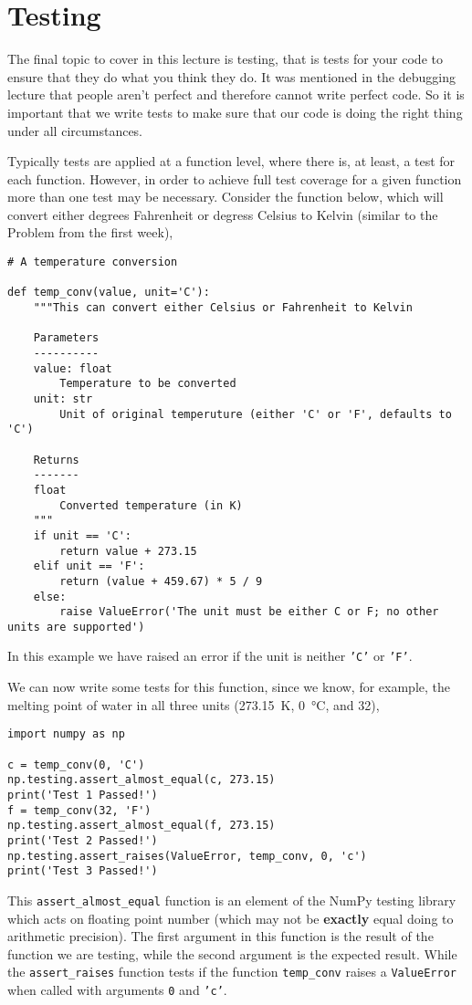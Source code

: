 \documentclass[a4paper]{article}
\begin{document}
\section{Testing}
The final topic to cover in this lecture is testing, that is tests for your code to ensure that they do what you think they do.
It was mentioned in the debugging lecture that people aren't perfect and therefore cannot write perfect code.
So it is important that we write tests to make sure that our code is doing the right thing under all circumstances.

Typically tests are applied at a function level, where there is, at least, a test for each function.
However, in order to achieve full test coverage for a given function more than one test may be necessary.
Consider the function below, which will convert either degrees Fahrenheit or degress Celsius to Kelvin (similar to the Problem from the first week),
\begin{lstlisting}
# A temperature conversion

def temp_conv(value, unit='C'):
    """This can convert either Celsius or Fahrenheit to Kelvin

    Parameters
    ----------
    value: float
        Temperature to be converted
    unit: str
        Unit of original temperuture (either 'C' or 'F', defaults to 'C')

    Returns
    -------
    float
        Converted temperature (in K)
    """
    if unit == 'C':
        return value + 273.15
    elif unit == 'F':
        return (value + 459.67) * 5 / 9
    else:
        raise ValueError('The unit must be either C or F; no other units are supported')
\end{lstlisting}
In this example we have raised an error if the unit is neither \texttt{'C'} or \texttt{'F'}.

We can now write some tests for this function, since we know, for example, the melting point of water in all three units (\SI{273.15}{\kelvin}, \SI{0}{\celsius}, and \SI{32}{\Fahrenheit}),
\begin{lstlisting}
import numpy as np

c = temp_conv(0, 'C')
np.testing.assert_almost_equal(c, 273.15)
print('Test 1 Passed!')
f = temp_conv(32, 'F')
np.testing.assert_almost_equal(f, 273.15)
print('Test 2 Passed!')
np.testing.assert_raises(ValueError, temp_conv, 0, 'c')
print('Test 3 Passed!')
\end{lstlisting}
This \texttt{assert\_almost\_equal} function is an element of the NumPy testing library which acts on floating point number (which may not be \textbf{exactly} equal doing to arithmetic precision).
The first argument in this function is the result of the function we are testing, while the second argument is the expected result.
While the \texttt{assert\_raises} function tests if the function \texttt{temp\_conv} raises a \texttt{ValueError} when called with arguments \texttt{0} and \texttt{'c'}.
\end{document}
